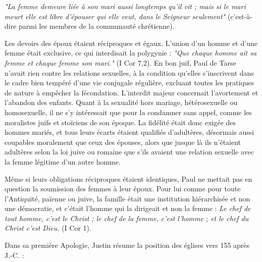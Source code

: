 \begin{displayquote}[I Cor 7,39]
\emph{"La femme demeure liée à son mari aussi longtemps qu'il vit ; mais si le mari meurt elle est libre d'épouser qui elle veut, dans le Seigneur seulement"} (c'est-à-dire parmi les membres de la communauté chrétienne).
\end{displayquote}
 
 Les devoirs des époux étaient réciproques et égaux. L'union d'un homme et d'une femme était exclusive, ce qui interdisait la polygynie : \emph{"Que chaque homme ait sa femme et chaque femme son mari."} (I Cor 7,2). En bon juif, Paul de Tarse n'avait rien contre les relations sexuelles, à la condition qu'elles s'inscrivent dans le cadre bien tempéré d'une vie conjugale régulière, excluant toutes les pratiques de nature à empêcher la fécondation. L'interdit majeur concernait l'avortement et l'abandon des enfants. Quant à la sexualité hors mariage, hétérosexuelle ou homosexuelle, il ne s'y intéressait que pour la condamner sans appel, comme les moralistes juifs et stoïciens de son époque. La fidélité était donc exigée des hommes mariés, et tous leurs écarts étaient qualifiés d'adultères, désormais aussi coupables moralement que ceux des épouses, alors que jusque là ils n'étaient adultères selon la loi juive ou romaine que s'ils avaient une relation sexuelle avec la femme légitime d'un autre homme. 
 
 Même si leurs obligations réciproques étaient identiques, Paul ne mettait pas en question la soumission des femmes à leur époux. Pour lui comme pour toute l'Antiquité, païenne ou juive, la famille était une institution hiérarchisée et non une démocratie, et c'était l'homme qui la dirigeait et non la femme : \emph{Le chef de tout homme, c'est le Christ ; le chef de la femme, c'est l'homme ; et le chef du Christ c'est Dieu.} (I Cor 1).

Dans sa première Apologie, Justin résume la position des églises vers 155 après J.-C. :

